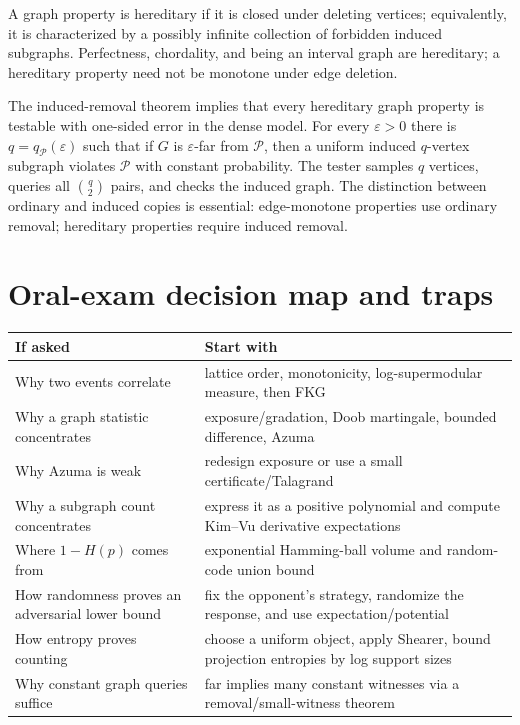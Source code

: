 \documentclass[10pt]{article}
\newcommand{\1}{\mathbf 1}
\begin{document}
A graph property is hereditary if it is closed under deleting vertices;
equivalently, it is characterized by a possibly infinite collection of forbidden
induced subgraphs.  Perfectness, chordality, and being an interval graph are
hereditary; a hereditary property need not be monotone under edge deletion.

The induced-removal theorem implies that every hereditary graph property is
testable with one-sided error in the dense model.  For every $\varepsilon>0$
there is $q=q_{\mathcal P}(\varepsilon)$ such that if $G$ is
$\varepsilon$-far from $\mathcal P$, then a uniform induced $q$-vertex subgraph
violates $\mathcal P$ with constant probability.  The tester samples $q$
vertices, queries all $\binom q2$ pairs, and checks the induced graph.
The distinction between ordinary and induced copies is essential:
edge-monotone properties use ordinary removal; hereditary properties require
induced removal.
\endgroup

\section*{Oral-exam decision map and traps}

\begin{center}\small
\begin{tabularx}{\textwidth}{@{}lX@{}}
\toprule
\textbf{If asked} & \textbf{Start with}\\
\midrule
Why two events correlate & lattice order, monotonicity, log-supermodular measure,
then FKG\\
Why a graph statistic concentrates & exposure/gradation, Doob martingale,
bounded difference, Azuma\\
Why Azuma is weak & redesign exposure or use a small certificate/Talagrand\\
Why a subgraph count concentrates & express it as a positive polynomial and
compute Kim--Vu derivative expectations\\
Where $1-H(p)$ comes from & exponential Hamming-ball volume and random-code
union bound\\
How randomness proves an adversarial lower bound & fix the opponent's strategy,
randomize the response, and use expectation/potential\\
How entropy proves counting & choose a uniform object, apply Shearer, bound
projection entropies by log support sizes\\
Why constant graph queries suffice & far implies many constant witnesses via a
removal/small-witness theorem\\
\bottomrule
\end{tabularx}
\end{center}
\end{document}
